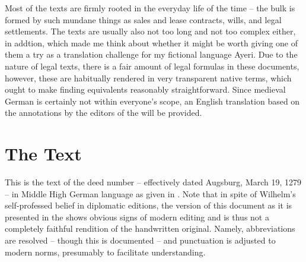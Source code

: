 \documentclass[12pt,paper=a4]{scrartcl}
\begin{document}
Most of the texts are firmly rooted in the everyday life of the time – the bulk is formed by such mundane things as sales and lease contracts, wills, and legal settlements. The texts are usually also not too long and not too complex either, in addtion, which made me think about whether it might be worth giving one of them a try as a translation challenge for my fictional language Ayeri. Due to the nature of legal texts, there is a fair amount of legal formulas in these documents, however, these are habitually rendered in very transparent native terms, which ought to make finding equivalents reasonably straightforward. Since medieval German is certainly not within everyone's scope, an English translation based on the annotations by the editors of the  will be provided.

\section{The Text}
This is the text of the deed number  -- effectively dated Augsburg, March 19, 1279 -- in Middle High German language as given in \textcite{n163}. Note that in spite of Wilhelm's self-professed belief in diplomatic editions, the version of this document as it is presented in the  shows obvious signs of modern editing and is thus not a completely faithful rendition of the handwritten original. Namely, abbreviations are resolved – though this is documented – and punctuation is adjusted to modern norms, presumably to facilitate understanding.
\end{document}
